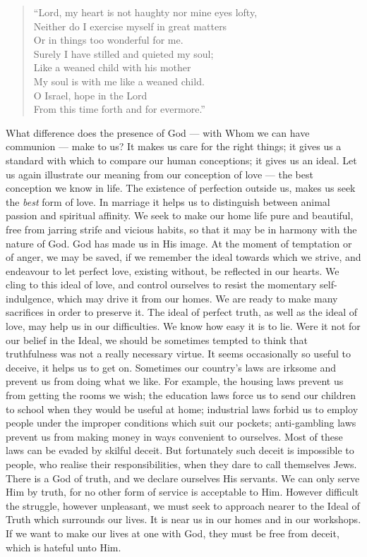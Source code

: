 \begin{quote}
  “Lord, my heart is not haughty nor mine eyes lofty,\\
Neither do I exercise myself in great matters\\
Or in things too wonderful for me.\\
Surely I have stilled and quieted my soul;\\
Like a weaned child with his mother\\
My soul is with me like a weaned child.\\
O Israel, hope in the Lord\\
From this time forth and for evermore.”
\end{quote}

What difference does the presence of God
— with Whom we can have communion —
make to us? It makes us care for the
right things; it gives us a standard with
which to compare our human conceptions;
it gives us an ideal. Let us again illustrate
our meaning from our conception of
love — the best conception we know in life.
The existence of perfection outside us, makes
us seek the \textsl{best} form of love. In marriage
it helps us to distinguish between animal
passion and spiritual affinity. We seek to
make our home life pure and beautiful, free
from jarring strife and vicious habits, so that
it may be in harmony with the nature of
God. God has made us in His image. At
the moment of temptation or of anger, we
may be saved, if we remember the ideal
towards which we strive, and endeavour to
let perfect love, existing without, be reflected
in our hearts. We cling to this ideal of
love, and control ourselves to resist the
momentary self-indulgence, which may drive
it from our homes. We are ready to make
many sacrifices in order to preserve it.
The ideal of perfect truth, as well as the
ideal of love, may help us in our difficulties.
We know how easy it is to lie. Were it not
for our belief in the Ideal, we should be
sometimes tempted to think that truthfulness
was not a really necessary virtue. It seems
occasionally so useful to deceive, it helps us
to get on. Sometimes our country’s laws
are irksome and prevent us from doing what
we like. For example, the housing laws
prevent us from getting the rooms we wish;
the education laws force us to send our
children to school when they would be useful
at home; industrial laws forbid us to employ
people under the improper conditions which
suit our pockets; anti-gambling laws prevent
us from making money in ways convenient
to ourselves. Most of these laws can be
evaded by skilful deceit. But fortunately
such deceit is impossible to people, who
realise their responsibilities, when they dare
to call themselves Jews. There is a God of
truth, and we declare ourselves His servants.
We can only serve Him by truth, for no
other form of service is acceptable to
Him. However difficult the struggle, however
unpleasant, we must seek to approach
nearer to the Ideal of Truth which surrounds
our lives. It is near us in our
homes and in our workshops. If we want
to make our lives at one with God, they
must be free from deceit, which is hateful
unto Him.

